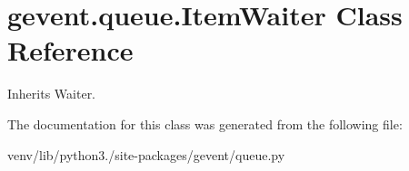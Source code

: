 \hypertarget{classgevent_1_1queue_1_1_item_waiter}{}\section{gevent.\+queue.\+Item\+Waiter Class Reference}
\label{classgevent_1_1queue_1_1_item_waiter}


Inherits Waiter.



The documentation for this class was generated from the following file\+:\begin{DoxyCompactItemize}
\item 
venv/lib/python3./site-\/packages/gevent/queue.\+py\end{DoxyCompactItemize}
